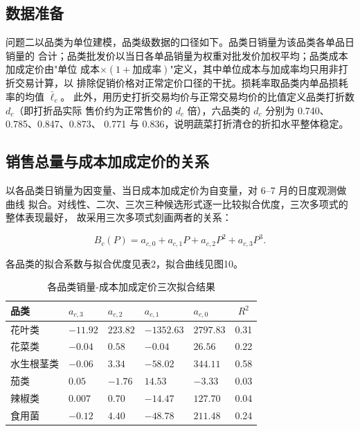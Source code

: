 
\subsection{数据准备}

问题二以品类为单位建模，品类级数据的口径如下。品类日销量为该品类各单品日销量的
合计；品类批发价以当日各单品销量为权重对批发价加权平均；品类成本加成定价由"单位
成本$\times(1+\text{加成率})$"定义，其中单位成本与加成率均只用非打折交易计算，以
排除促销价格对正常定价口径的干扰。损耗率取品类内单品损耗率的均值 $\bar\ell_c$。
此外，用历史打折交易均价与正常交易均价的比值定义品类打折数 $d_c$（即打折品实际
售价约为正常售价的 $d_c$ 倍），六品类的 $d_c$ 分别为 0.740、0.785、0.847、0.873、
0.771 与 0.836，说明蔬菜打折清仓的折扣水平整体稳定。

\subsection{销售总量与成本加成定价的关系}

以各品类日销量为因变量、当日成本加成定价为自变量，对 6--7 月的日度观测做曲线
拟合。对线性、二次、三次三种候选形式逐一比较拟合优度，三次多项式的整体表现最好，
故采用三次多项式刻画两者的关系：

\begin{equation}
B_c(P)=a_{c,0}+a_{c,1}P+a_{c,2}P^2+a_{c,3}P^3.
\label{eq:cubic}
\end{equation}

各品类的拟合系数与拟合优度见表2，拟合曲线见图10。

\begin{table}[H]
\centering
\caption{各品类销量-成本加成定价三次拟合结果}
\label{tab:cubic}
\small
\begin{tabular}{lllllc}
\toprule
品类 & $a_{c,3}$ & $a_{c,2}$ & $a_{c,1}$ & $a_{c,0}$ & $R^2$ \\
\midrule
花叶类 & $-11.92$ & $223.82$ & $-1352.63$ & $2797.83$ & 0.31 \\
花菜类 & $-0.04$ & $0.58$ & $-0.04$ & $26.56$ & 0.22 \\
水生根茎类 & $-0.06$ & $3.34$ & $-58.02$ & $344.11$ & 0.58 \\
茄类 & $0.05$ & $-1.76$ & $14.53$ & $-3.33$ & 0.03 \\
辣椒类 & $0.007$ & $0.70$ & $-14.47$ & $127.70$ & 0.04 \\
食用菌 & $-0.12$ & $4.40$ & $-48.78$ & $211.48$ & 0.24 \\
\bottomrule
\end{tabular}
\end{table}

